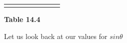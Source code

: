 \begin{center}
\begin{xtabular*}{\mytablewidth}[t]{|p{10\mystarwidth}|p{10\mystarwidth}|p{10\mystarwidth}|p{10\mystarwidth}|p{10\mystarwidth}|p{10\mystarwidth}|p{10\mystarwidth}|p{10\mystarwidth}|}
{    \addtocounter{footnote}{-0}
    
                }
     \tabularnewline{}
    \end{xtabular*}
      \end{center}
    \begin{center}{\small\bfseries Table 14.4}\end{center}
    
    \addtocounter{footnote}{-0}
    
    \par
  
        
        
        

        \label{m39414*id84056}Let us look back at our values for \begin{math}sin\theta \end{math}\par 
        
    
